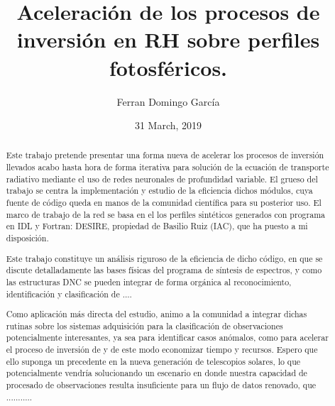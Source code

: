 \documentclass[8pt]{article}
\title{ Aceleración de los procesos de inversión en RH sobre perfiles fotosféricos.}
\date{31 March, 2019}
\author{Ferran Domingo García}
\begin{document}
	\maketitle
	\newpage

	\tableofcontents
	\newpage

	\begin{abstract}
	
		Este trabajo pretende presentar una forma nueva de acelerar los procesos de inversión llevados acabo hasta hora de forma iterativa para solución de la ecuación de transporte radiativo mediante el uso de redes neuronales de profundidad variable. El grueso del trabajo se centra la implementación y estudio de la eficiencia dichos módulos, cuya fuente de código queda en manos de la comunidad científica para su posterior uso. El marco de trabajo de la red se basa en el los perfiles sintéticos generados con programa en IDL y Fortran: DESIRE, propiedad de Basilio Ruiz (IAC), que ha puesto a mi disposición. \newline
		
		Este trabajo constituye un análisis riguroso de la eficiencia de dicho código, en que se discute detalladamente las bases físicas del programa de síntesis de espectros, y como las estructuras DNC se pueden integrar de forma orgánica al reconocimiento, identificación y clasificación de ....  \newline
		
		Como aplicación más directa del estudio, animo a la comunidad a integrar dichas rutinas sobre los sistemas adquisición para la clasificación de observaciones potencialmente interesantes, ya sea para identificar casos anómalos, como para acelerar el proceso de inversión de y de este modo economizar tiempo y recursos. Espero que ello suponga un precedente en la nueva generación de telescopios solares, lo que potencialmente vendría solucionando un escenario en donde nuestra capacidad de procesado de observaciones resulta insuficiente para un flujo de datos renovado, que ...........
		
	\end{abstract}\newpage
	
	\renewcommand\abstractname{Agradecimientos}
	
\end{document}
